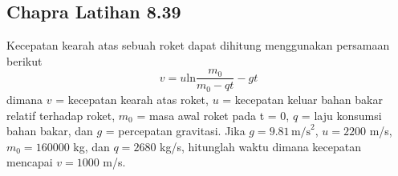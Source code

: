 \subsection{Chapra Latihan 8.39}
Kecepatan kearah atas sebuah roket dapat dihitung menggunakan persamaan berikut
\begin{equation*}
v = u \mathrm{ln}\frac{m_{0}}{m_{0} - qt} - gt
\end{equation*}
dimana $v$ = kecepatan kearah atas roket,
$u$ = kecepatan keluar bahan bakar relatif terhadap
roket, $m_0 $ = masa awal roket pada t = 0, $q$ = laju konsumsi bahan bakar,
dan $g$ = percepatan gravitasi. Jika $g = 9.81 \, \mathrm{m/s}^2$,
$u = 2200$ m/s, $m_0 = 160000$ kg,
dan $q = 2680$ kg/s, hitunglah waktu
dimana kecepatan mencapai $v = 1000$ m/s.